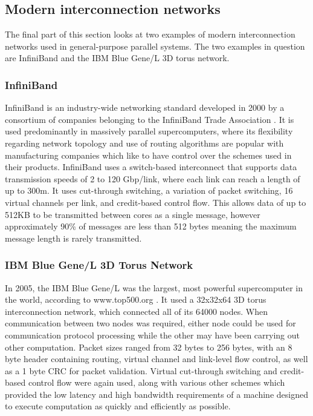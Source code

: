 \documentclass[a4paper, 12pt]{article}
\begin{document}
\subsection{Modern interconnection networks}

The final part of this section looks at two examples of modern interconnection networks used in general-purpose parallel systems. The two examples in question are InfiniBand and the IBM Blue Gene/L 3D torus network.

\subsubsection{InfiniBand}

InfiniBand is an industry-wide networking standard developed in 2000 by a consortium of companies belonging to the InfiniBand Trade Association \cite{Hen11}. It is used predominantly in massively parallel supercomputers, where its flexibility regarding network topology and use of routing algorithms are popular with manufacturing companies which like to have control over the schemes used in their products. InfiniBand uses a switch-based interconnect that supports data transmission speeds of 2 to 120 Gbp/link, where each link can reach a length of up to 300m. It uses cut-through switching, a variation of packet switching, 16 virtual channels per link, and credit-based control flow. This allows data of up to 512KB to be transmitted between cores as a single message, however approximately 90\% of messages are less than 512 bytes meaning the maximum message length is rarely transmitted. 

\subsubsection{IBM Blue Gene/L 3D Torus Network}

In 2005, the IBM Blue Gene/L was the largest, most powerful supercomputer in the world, according to www.top500.org \cite{Hen11}. It used a 32x32x64 3D torus interconnection network, which connected all of its 64000 nodes. When communication between two nodes was required, either node could be used for  communication protocol processing while the other may have been carrying out other computation. Packet sizes ranged from 32 bytes to 256 bytes, with an 8 byte header containing routing, virtual channel and link-level flow control, as well as a 1 byte CRC for packet validation. Virtual cut-through switching and credit-based control flow were again used, along with various other schemes which provided the low latency and high bandwidth requirements of a machine designed to execute computation as quickly and efficiently as possible.
\end{document}
